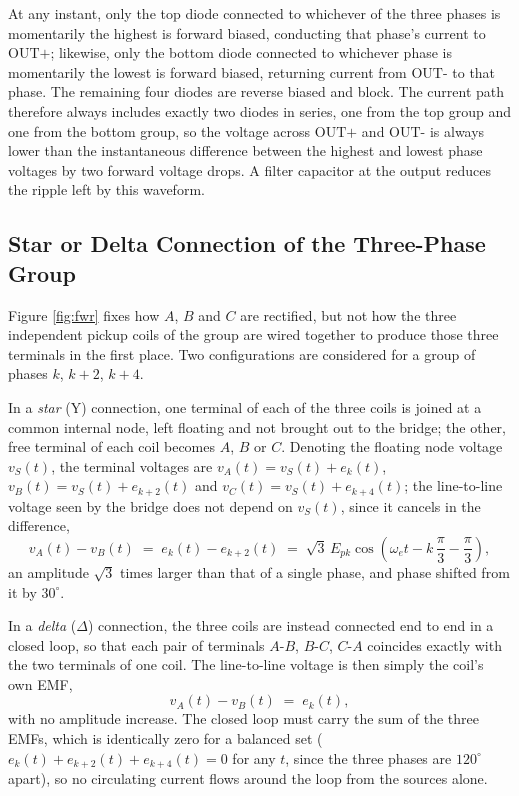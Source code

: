 At any instant, only the top diode connected to whichever of the three phases is momentarily the highest is forward biased, conducting that phase's current to $\text{OUT+}$; likewise, only the bottom diode connected to whichever phase is momentarily the lowest is forward biased, returning current from $\text{OUT-}$ to that phase. The remaining four diodes are reverse biased and block. The current path therefore always includes exactly two diodes in series, one from the top group and one from the bottom group, so the voltage across $\text{OUT+}$ and $\text{OUT-}$ is always lower than the instantaneous difference between the highest and lowest phase voltages by two forward voltage drops. A filter capacitor at the output reduces the ripple left by this waveform.

\subsection{Star or Delta Connection of the Three-Phase Group}

Figure \ref{fig:fwr} fixes how $A$, $B$ and $C$ are rectified, but not how the three independent pickup coils of the group are wired together to produce those three terminals in the first place. Two configurations are considered for a group of phases $k$, $k+2$, $k+4$.

In a \emph{star} (Y) connection, one terminal of each of the three coils is joined at a common internal node, left floating and not brought out to the bridge; the other, free terminal of each coil becomes $A$, $B$ or $C$. Denoting the floating node voltage $v_S(t)$, the terminal voltages are $v_A(t)=v_S(t)+e_k(t)$, $v_B(t)=v_S(t)+e_{k+2}(t)$ and $v_C(t)=v_S(t)+e_{k+4}(t)$; the line-to-line voltage seen by the bridge does not depend on $v_S(t)$, since it cancels in the difference,
\begin{equation}
    v_A(t)-v_B(t) \;=\; e_k(t)-e_{k+2}(t) \;=\; \sqrt{3}\,E_{pk}\cos\!\left(\omega_e t - k\,\frac{\pi}{3}-\frac{\pi}{3}\right),
    \label{eq:star_line}
\end{equation}
an amplitude $\sqrt{3}$ times larger than that of a single phase, and phase shifted from it by $30^\circ$.

In a \emph{delta} ($\Delta$) connection, the three coils are instead connected end to end in a closed loop, so that each pair of terminals $A$-$B$, $B$-$C$, $C$-$A$ coincides exactly with the two terminals of one coil. The line-to-line voltage is then simply the coil's own EMF,
\begin{equation}
    v_A(t)-v_B(t) \;=\; e_k(t),
    \label{eq:delta_line}
\end{equation}
with no amplitude increase. The closed loop must carry the sum of the three EMFs, which is identically zero for a balanced set ($e_k(t)+e_{k+2}(t)+e_{k+4}(t)=0$ for any $t$, since the three phases are $120^\circ$ apart), so no circulating current flows around the loop from the sources alone.

